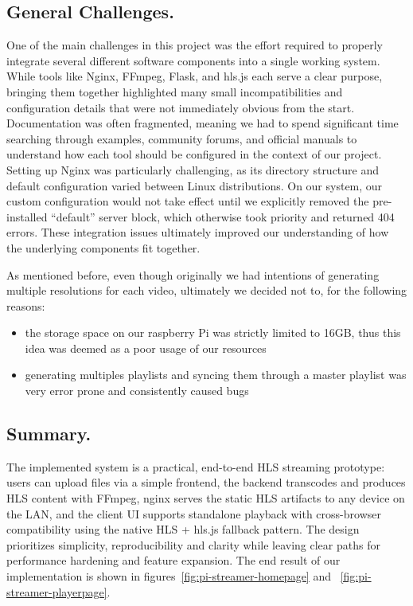 \documentclass[11pt]{article}
\begin{document}
\subsection{General Challenges.}
One of the main challenges in this project was the effort required to properly integrate several different software components into a single working system. While tools like Nginx, FFmpeg, Flask, and hls.js each serve a clear purpose, bringing them together highlighted many small incompatibilities and configuration details that were not immediately obvious from the start. Documentation was often fragmented, meaning we had to spend significant time searching through examples, community forums, and official manuals to understand how each tool should be configured in the context of our project. Setting up Nginx was particularly challenging, as its directory structure and default configuration varied between Linux distributions. On our system, our custom configuration would not take effect until we explicitly removed the pre-installed “default” server block, which otherwise took priority and returned 404 errors. These integration issues ultimately improved our understanding of how the underlying components fit together.

As mentioned before, even though originally we had intentions of generating multiple resolutions for each video, ultimately we decided not to, for the following reasons:
\begin{itemize}
    \item the storage space on our raspberry Pi was strictly limited to 16GB, thus this idea was deemed as a poor usage of our resources
    \item generating multiples playlists and syncing them through a master playlist was very error prone and consistently caused bugs
\end{itemize}
\newpage
\subsection{Summary.}
The implemented system is a practical, end-to-end HLS streaming prototype: users can upload files via a simple frontend, the backend transcodes and produces HLS content with FFmpeg, nginx serves the static HLS artifacts to any device on the LAN, and the client UI supports standalone playback with cross-browser compatibility using the native HLS + hls.js fallback pattern. The design prioritizes simplicity, reproducibility and clarity while leaving clear paths for performance hardening and feature expansion. The end result of our implementation is shown in figures~\ref{fig:pi-streamer-homepage} and ~\ref{fig:pi-streamer-playerpage}.
\end{document}
